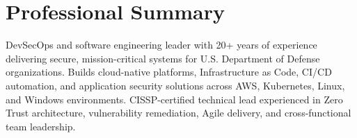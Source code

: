 \section{Professional Summary}
DevSecOps and software engineering leader with 20+ years of experience delivering secure, mission-critical systems for U.S. Department of Defense organizations. Builds cloud-native platforms, Infrastructure as Code, CI/CD automation, and application security solutions across AWS, Kubernetes, Linux, and Windows environments. CISSP-certified technical lead experienced in Zero Trust architecture, vulnerability remediation, Agile delivery, and cross-functional team leadership.
